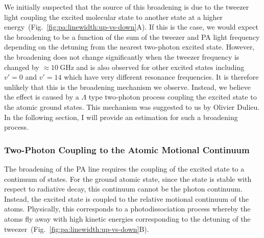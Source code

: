 We initially suspected that the source of this broadening is due to the tweezer light
coupling the excited molecular state to another state at
a higher energy~(Fig.~\ref{fig:pa:linewidth:up-vs-down}A).
If this is the case, we would expect the broadening to be a function of
the sum of the tweezer and PA light frequency depending on the detuning from the nearest
two-photon excited state.
However, the broadening does not change significantly when the tweezer frequency
is changed by $\approx\!10~\mathrm{GHz}$ and
is also observed for other excited states including $v'=0$ and $v'=14$
which have very different resonance frequencies.
It is therefore unlikely that this is the broadening mechanism we observe.
Instead, we believe the effect is caused by a $\Lambda$ type two-photon process
coupling the excited state to the atomic ground states.
This mechanism was suggested to us by Olivier Dulieu.
In the following section, I will provide an estimation for such a broadening process.

\subsubsection{Two-Photon Coupling to the Atomic Motional Continuum}
\label{ch:pa:linewidth:two-photn-down}
The broadening of the PA line requires the coupling of the excited state to a continuum of states.
For the ground atomic state, since the state is stable with respect to radiative decay,
this continuum cannot be the photon continuum.
Instead, the excited state is coupled to the relative motional continuum of the atoms.
Physically, this corresponds to a photodissociation process
whereby the atoms fly away with high kinetic energies corresponding
to the detuning of the tweezer~(Fig.~\ref{fig:pa:linewidth:up-vs-down}B).

